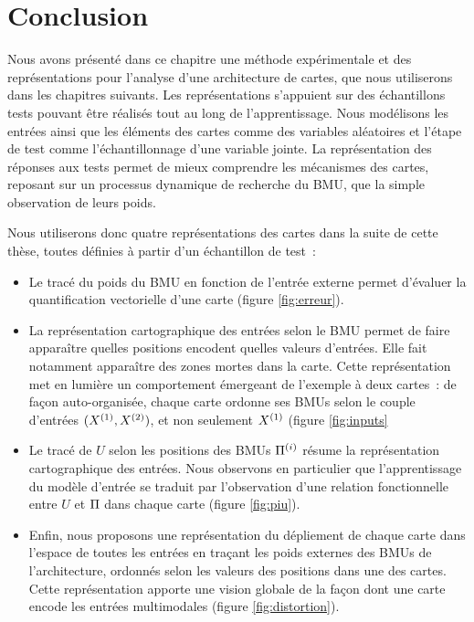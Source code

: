 \documentclass[../main]{subfiles}
\begin{document}
\section{Conclusion}

Nous avons présenté dans ce chapitre une méthode expérimentale et des représentations pour l'analyse d'une architecture de cartes, que nous utiliserons dans les chapitres suivants.
Les représentations s'appuient sur des échantillons tests pouvant être réalisés tout au long de l'apprentissage.
Nous modélisons les entrées ainsi que les éléments des cartes comme des variables aléatoires et l'étape de test comme l'échantillonnage d'une variable jointe. 
La représentation des réponses aux tests permet de mieux comprendre les mécanismes des cartes, reposant sur un processus dynamique de recherche du BMU, que la simple observation de leurs poids.

Nous utiliserons donc quatre représentations des cartes dans la suite de cette thèse, toutes définies à partir d'un échantillon de test~:
\begin{itemize}
    \item Le tracé du poids du BMU en fonction de l'entrée externe permet d'évaluer la quantification vectorielle d'une carte (figure \ref{fig:erreur}).
    \item La représentation cartographique des entrées selon le BMU permet de faire apparaître quelles positions encodent quelles valeurs d'entrées. Elle fait notamment apparaître des zones mortes dans la carte. Cette représentation met en lumière un comportement émergeant de l'exemple à deux cartes~: de façon auto-organisée, chaque carte ordonne ses BMUs selon le couple d'entrées $(X^{({1})},X^{({2})})$, et non seulement $X^{({1})}$ (figure \ref{fig:inputs}
    \item Le tracé de $U$ selon les positions des BMUs $\Pi^{({i})}$ résume la représentation cartographique des entrées. Nous observons en particulier que l'apprentissage du modèle d'entrée se traduit par l'observation d'une relation fonctionnelle entre $U$ et $\Pi$ dans chaque carte (figure \ref{fig:piu}).
    \item Enfin, nous proposons une représentation du dépliement de chaque carte dans l'espace de toutes les entrées en traçant les poids externes des BMUs de l'architecture, ordonnés selon les valeurs des positions dans une des cartes. Cette représentation apporte une vision globale de la façon dont une carte encode les entrées multimodales (figure \ref{fig:distortion}).
\end{itemize}
\end{document}
